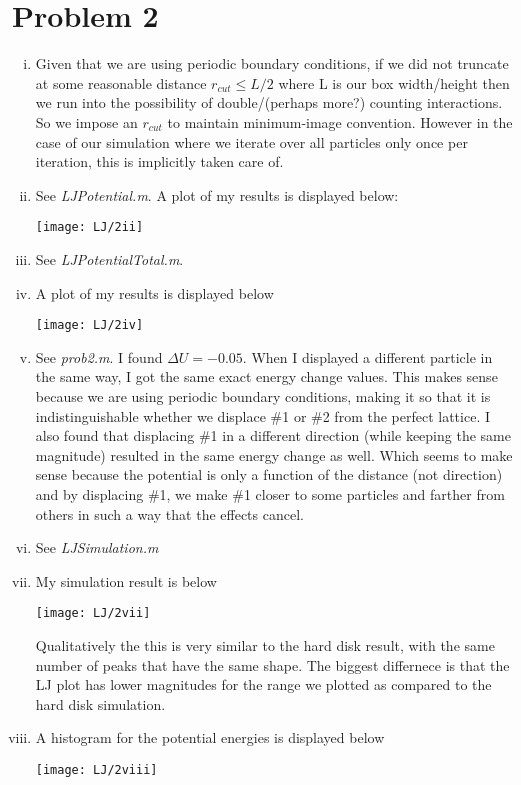 \documentclass{article}
\begin{document}
\section*{Problem 2}
\begin{enumerate}[i.]
  \item Given that we are using periodic boundary conditions, if we did not truncate at some reasonable distance $r_{cut} \leq L/2$ where L is our box width/height then we run into the possibility of double/(perhaps more?) counting interactions. So we impose an $r_{cut}$ to maintain minimum-image convention. However in the case of our simulation where we iterate over all particles only once per iteration, this is implicitly taken care of.

  \item See \textit{LJPotential.m}. A plot of my results is displayed below:
    \begin{center}
      \texttt{[image: LJ/2ii]}
    \end{center}

  \item See \textit{LJPotentialTotal.m}.

  \item A plot of my results is displayed below
    \begin{center}
      \texttt{[image: LJ/2iv]}
    \end{center}

  \item See \textit{prob2.m}. I found $\Delta U = -0.05$. When I displayed a different particle in the same way, I got the same exact energy change values. This makes sense because we are using periodic boundary conditions, making it so that it is indistinguishable whether we displace \#1 or \#2 from the perfect lattice. I also found that displacing \#1 in a different direction (while keeping the same magnitude) resulted in the same energy change as well. Which seems to make sense because the potential is only a function of the distance (not direction) and by displacing \#1, we make \#1 closer to some particles and farther from others in such a way that the effects cancel.

  \item See \textit{LJSimulation.m}

  \item My simulation result is below
    \begin{center}
      \texttt{[image: LJ/2vii]}
    \end{center}

    Qualitatively the this is very similar to the hard disk result, with the same number of peaks that have the same shape. The biggest differnece is that the LJ plot has lower magnitudes for the range we plotted as compared to the hard disk simulation. 
    
  \item A histogram for the potential energies is displayed below
    \begin{center}
      \texttt{[image: LJ/2viii]}
    \end{center}

\end{enumerate}
\end{document}
